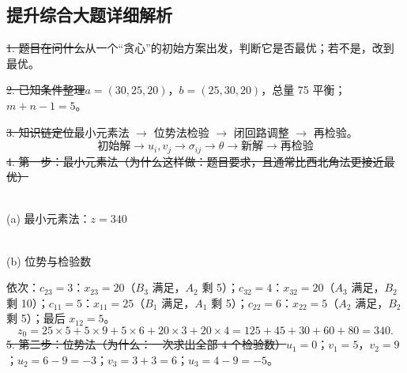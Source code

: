 \subsection*{提升综合大题详细解析}
\st{1. 题目在问什么}从一个“贪心”的初始方案出发，判断它是否最优；若不是，改到最优。\par
\st{2. 已知条件整理}$a=(30,25,20)$，$b=(25,30,20)$，总量 75 平衡；$m+n-1=5$。\par
\st{3. 知识链定位}最小元素法 $\to$ 位势法检验 $\to$ 闭回路调整 $\to$ 再检验。
\[\text{初始解}\rightarrow u_i,v_j\rightarrow\sigma_{ij}\rightarrow\theta\rightarrow\text{新解}\rightarrow\text{再检验}\]
\st{4. 第一步：最小元素法（为什么这样做：题目要求，且通常比西北角法更接近最优）}
\begin{center}
\begin{minipage}{0.48\linewidth}\centering
{}\\{\small (a) 最小元素法：$z=340$}
\end{minipage}\hfill
\begin{minipage}{0.48\linewidth}\centering
{}\\{\small (b) 位势与检验数}
\end{minipage}
\end{center}
依次：$c_{23}=3$：$x_{23}=20$（$B_3$ 满足，$A_2$ 剩 5）；$c_{32}=4$：$x_{32}=20$（$A_3$ 满足，$B_2$ 剩 10）；$c_{11}=5$：$x_{11}=25$（$B_1$ 满足，$A_1$ 剩 5）；$c_{22}=6$：$x_{22}=5$（$A_2$ 满足，$B_2$ 剩 5）；最后 $x_{12}=5$。
\[z_0=25\times5+5\times9+5\times6+20\times3+20\times4=125+45+30+60+80=340.\]
\st{5. 第二步：位势法（为什么：一次求出全部 4 个检验数）}$u_1=0$；$v_1=5$，$v_2=9$；$u_2=6-9=-3$；$v_3=3+3=6$；$u_3=4-9=-5$。

